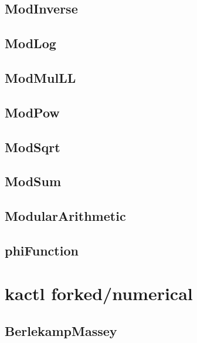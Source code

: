 \subsection{ModInverse}
\raggedbottom
\hrulefill
\subsection{ModLog}
\raggedbottom
\hrulefill
\subsection{ModMulLL}
\raggedbottom
\hrulefill
\subsection{ModPow}
\raggedbottom
\hrulefill
\subsection{ModSqrt}
\raggedbottom
\hrulefill
\subsection{ModSum}
\raggedbottom
\hrulefill
\subsection{ModularArithmetic}
\raggedbottom
\hrulefill
\subsection{phiFunction}
\raggedbottom
\hrulefill

\section{kactl forked/numerical}
\subsection{BerlekampMassey}
\raggedbottom
\hrulefill
